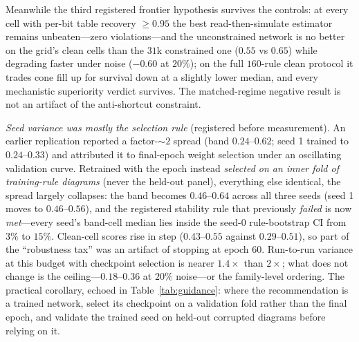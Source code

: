 \documentclass[aip,cha,amsmath,amssymb,reprint,floatfix]{revtex4-2}
\begin{document}
Meanwhile the third
registered frontier hypothesis survives the controls: at every cell with per-bit
table recovery ${\ge}0.95$ the best read-then-simulate estimator remains
unbeaten---zero violations---and the unconstrained network is no better on
the grid's clean cells than the $31$k constrained one ($0.55$ vs $0.65$)
while degrading faster under noise ($-0.60$ at $20\%$); on the full
$160$-rule clean protocol it trades cone fill up for survival down at a
slightly lower median, and every mechanistic superiority verdict survives.
The matched-regime
negative result is not an artifact of the anti-shortcut constraint.

\emph{Seed variance was mostly the selection rule} (registered before
measurement). An earlier replication reported a factor-${\sim}2$ spread
(band $0.24$--$0.62$; seed 1 trained to $0.24$--$0.33$) and attributed it to
final-epoch weight selection under an oscillating validation curve. Retrained
with the epoch instead \emph{selected on an inner fold of training-rule
diagrams} (never the held-out panel), everything else identical, the spread
largely collapses: the band becomes $0.46$--$0.64$ across all three seeds
(seed 1 moves to $0.46$--$0.56$), and the registered stability rule that
previously \emph{failed} is now \emph{met}---every seed's band-cell median
lies inside the seed-0 rule-bootstrap CI from $3\%$ to $15\%$. Clean-cell
scores rise in step ($0.43$--$0.55$ against $0.29$--$0.51$), so part of the
``robustness tax'' was an artifact of stopping at epoch $60$. Run-to-run
variance at this budget with checkpoint selection is nearer $1.4\times$ than
$2\times$; what does not change is the ceiling---$0.18$--$0.36$ at $20\%$
noise---or the family-level ordering. The practical corollary, echoed in
Table~\ref{tab:guidance}: where the recommendation is a trained network,
select its checkpoint on a validation fold rather than the final epoch, and
validate the trained seed on held-out corrupted diagrams before relying on
it.
\end{document}
